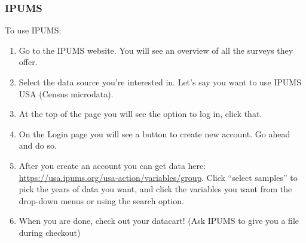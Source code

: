 \documentclass{beamer}
\begin{document}
\begin{frame}[allowframebreaks]
 \frametitle{IPUMS}

	
	To use IPUMS:
    \begin{enumerate}
	    \item 
	    Go to the IPUMS website. You will see an overview of all the surveys they offer.
	    \item 
	    Select the data source you're interested in. Let's say you want to use IPUMS USA (Census microdata).
	    \item 
	    At the top of the page you will see the option to log in, click that.
	    \item 
	    On the Login page you will see a button to create new account. Go ahead and do so.
	    \item 
	    After you create an account you can get data here: \scriptsize\url{https://usa.ipums.org/usa-action/variables/group}\normalsize. Click ``select samples'' to pick the years of data you want, and click the variables you want from the drop-down menus or using the search option.
	    \item 
	    When you are done, check out your datacart! (Ask IPUMS to give you a  file during checkout)
	    \vskip5cm
    \end{enumerate}
	

\end{frame}
\end{document}
